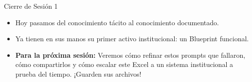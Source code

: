 \documentclass[aspectratio=169]{beamer}
\begin{document}
\begin{frame}{Cierre de Sesión 1}

\begin{itemize}
  \item Hoy pasamos del conocimiento tácito al conocimiento documentado.
  \item Ya tienen en sus manos su primer activo institucional: un Blueprint funcional.
  \item \textbf{Para la próxima sesión:} Veremos cómo refinar estos prompts que fallaron, cómo compartirlos y cómo escalar este Excel a un sistema institucional a prueba del tiempo. ¡Guarden sus archivos!
\end{itemize}
\end{frame}
\end{document}
